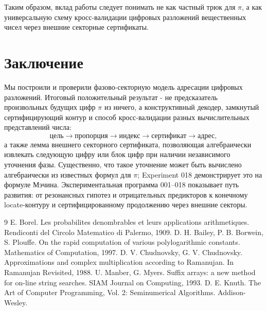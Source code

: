 \documentclass[11pt,a4paper]{article}
\begin{document}
Таким образом, вклад работы следует понимать не как частный трюк для $\pi$, а как универсальную схему кросс-валидации цифровых разложений вещественных чисел через внешние секторные сертификаты.

\section{Заключение}

Мы построили и проверили фазово-секторную модель адресации цифровых разложений.  Итоговый положительный результат - не предсказатель произвольных будущих цифр $\pi$ из ничего, а конструктивный декодер, замкнутый сертифицирующий контур и способ кросс-валидации разных вычислительных представлений числа:
\[
  \text{цель}\to\text{пропорция}\to\text{индекс}\to\text{сертификат}\to\text{адрес},
\]
а также лемма внешнего секторного сертификата, позволяющая алгебраически извлекать следующую цифру или блок цифр при наличии независимого уточнения фазы.  Существенно, что такое уточнение может быть вычислено алгебраически из известных формул для $\pi$; Experiment 018 демонстрирует это на формуле Мэчина.  Экспериментальная программа 001--018 показывает путь развития: от резонансных гипотез и отрицательных предикторов к конечному locate-контуру и сертифицированному продолжению через внешние секторы.

\newpage
\begin{thebibliography}{9}
 E. Borel. Les probabilites denombrables et leurs applications arithmetiques. Rendiconti del Circolo Matematico di Palermo, 1909.
 D. H. Bailey, P. B. Borwein, S. Plouffe. On the rapid computation of various polylogarithmic constants. Mathematics of Computation, 1997.
 D. V. Chudnovsky, G. V. Chudnovsky. Approximations and complex multiplication according to Ramanujan. In Ramanujan Revisited, 1988.
 U. Manber, G. Myers. Suffix arrays: a new method for on-line string searches. SIAM Journal on Computing, 1993.
 D. E. Knuth. The Art of Computer Programming, Vol. 2: Seminumerical Algorithms. Addison-Wesley.
\end{thebibliography}
\end{document}
